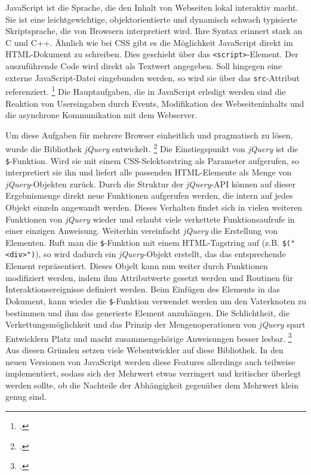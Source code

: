 \label{par:javascript}
JavaScript ist die Sprache, die den Inhalt von Webseiten lokal interaktiv macht.
Sie ist eine leichtgewichtige, objektorientierte und dynamisch schwach typisierte Skriptsprache, die von Browsern interpretiert wird.
Ihre Syntax erinnert stark an C und C++.
Ähnlich wie bei \ac{CSS} gibt es die Möglichkeit JavaScript direkt im \ac{HTML}-Dokument zu schreiben.
Dies geschieht über das \lstinline[style=eclipse]{<script>}-Element.
Der auszuführende Code wird direkt als Textwert angegeben.
Soll hingegen eine externe JavaScript-Datei eingebunden werden, so wird sie über das \lstinline[style=eclipse]{src}-Attribut referenziert.
\footcite[Vgl.][198]{webTechnologies}
Die Hauptaufgaben, die in JavaScript erledigt werden sind die Reaktion von Usereingaben durch Events, Modifikation des Webseiteninhalts und die asynchrone Kommunikation mit dem Webserver.

\label{par:jquery}
Um diese Aufgaben für mehrere Browser einheitlich und pragmatisch zu lösen, wurde die  Bibliothek \textit{jQuery} entwickelt.
\footcite[Vgl.][]{jqueryHomepage}
Die Einstiegspunkt von \textit{jQuery} ist die \lstinline[style=eclipse]{$}-Funktion.
Wird sie mit einem \ac{CSS}-Selektorstring als Parameter aufgerufen, so interpretiert sie ihn und liefert alle passenden \ac{HTML}-Elemente als Menge von \textit{jQuery}-Objekten zurück.
Durch die Struktur der \textit{jQuery}-\ac{API} können auf dieser Ergebnismenge direkt neue Funktionen aufgerufen werden, die intern auf jedes Objekt einzeln angewandt werden.
Dieses Verhalten findet sich in vielen weiteren Funktionen von \textit{jQuery} wieder und erlaubt viele verkettete Funktionsaufrufe in einer einzigen Anweisung.
Weiterhin vereinfacht \textit{jQuery} die Erstellung von Elementen.
Ruft man die \lstinline[style=eclipse]{$}-Funktion mit einem \ac{HTML}-Tagstring auf (z.B. \lstinline[style=eclipse]{$("<div>")}), so wird dadurch ein \textit{jQuery}-Objekt erstellt, das das entsprechende Element repräsentiert.
Dieses Objelt kann nun weiter durch Funktionen modifiziert werden, indem ihm Attributwerte gesetzt werden und Routinen für Interaktionsereignisse definiert werden.
Beim Einfügen des Elements in das Dokument, kann wieder die \lstinline[style=eclipse]{$}-Funktion verwendet werden um den Vaterknoten zu bestimmen und ihm das generierte Element anzuhängen.
Die Schlichtheit, die Verkettungsmöglichkeit und das Prinzip der Mengenoperationen von \textit{jQuery} spart Entwicklern Platz und macht zusammengehörige Anweisungen besser lesbar.
\footcite[Vgl.][3\psqq]{jqueryReference}
Aus diesen Gründen setzen viele Webentwickler auf diese Bibliothek.
In den neuen Versionen von JavaScript werden diese Features allerdings auch teilweise implementiert, sodass sich der Mehrwert etwas verringert und kritischer überlegt werden sollte, ob die Nachteile der Abhängigkeit gegenüber dem Mehrwert klein genug sind.

